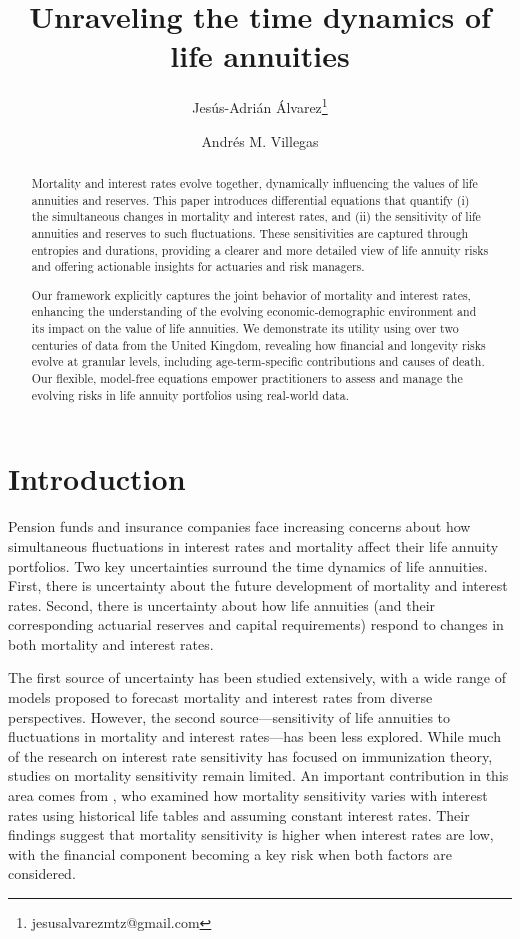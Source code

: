 \documentclass[12pt]{article}
\title{Unraveling the time dynamics of life annuities}
\author[1]{Jes\'us-Adri\'an \'Alvarez\thanks{jesusalvarezmtz@gmail.com}}
\author[2]{Andr\'es M. Villegas}
\affil[1]{{\small No affiliation} }
\affil[2]{\small{School of Risk and Actuarial Studies and ARC Centre of Excellence in Population Ageing Research (CEPAR)\\ UNSW Business School, Sydney, Australia}}
\begin{document}
\maketitle

{
\setcounter{tocdepth}{2}
}



\begin{abstract}
	
Mortality and interest rates evolve together, dynamically influencing the values of life annuities and reserves. This paper introduces differential equations that quantify (i) the simultaneous changes in mortality and interest rates, and (ii) the sensitivity of life annuities and reserves to such fluctuations. These sensitivities are captured through entropies and durations, providing a clearer and more detailed view of life annuity risks and offering actionable insights for actuaries and risk managers.

Our framework explicitly captures the joint behavior of mortality and interest rates, enhancing the understanding of the evolving economic-demographic environment and its impact on the value of life annuities. We demonstrate its utility using over two centuries of data from the United Kingdom, revealing how financial and longevity risks evolve at granular levels, including age-term-specific contributions and causes of death. Our flexible, model-free equations empower practitioners to assess and manage the evolving risks in life annuity portfolios using real-world data.

	
\end{abstract}
\newpage
\section{Introduction}\label{sec:1_introduction}


Pension funds and insurance companies face increasing concerns about how simultaneous fluctuations in interest rates and mortality affect their life annuity portfolios. Two key uncertainties surround the time dynamics of life annuities. First, there is uncertainty about the future development of mortality and interest rates. Second, there is uncertainty about how life annuities (and their corresponding actuarial reserves and capital requirements) respond to changes in both mortality and interest rates. 

The first source of uncertainty has been studied extensively, with a wide range of models proposed to forecast mortality and interest rates from diverse perspectives. However, the second source—sensitivity of life annuities to fluctuations in mortality and interest rates—has been less explored. While much of the research on interest rate sensitivity has focused on immunization theory, studies on mortality sensitivity remain limited. An important contribution in this area comes from \citet{rabitti2020mortality}, who examined how mortality sensitivity varies with interest rates using historical life tables and assuming constant interest rates. Their findings suggest that mortality sensitivity is higher when interest rates are low, with the financial component becoming a key risk when both factors are considered.
\end{document}
